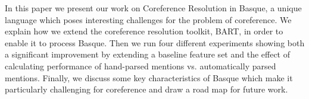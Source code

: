 In this paper we present our work on Coreference Resolution in Basque, a unique language which poses interesting challenges for the problem of coreference. We explain how we extend the coreference resolution toolkit, BART, in order to enable it to process Basque. Then we run four different experiments showing both a significant improvement by extending a baseline feature set and the effect of calculating performance of hand-parsed mentions vs. automatically parsed mentions. Finally, we discuss some key characteristics of Basque which make it particularly challenging for coreference and draw a road map for future work.
